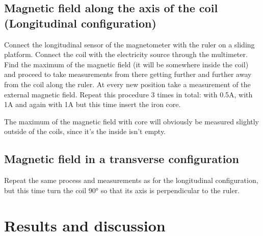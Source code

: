 \documentclass[12pt]{article}
\begin{document}
	\subsection{Magnetic field along the axis of the coil (Longitudinal configuration)}
	Connect the longitudinal sensor of the magnetometer with the ruler on a sliding platform. Connect the coil with the electricity source through the multimeter. Find the maximum of the magnetic field (it will be somewhere inside the coil) and proceed to take measurements from there getting further and further away from the coil along the ruler. At every new position take a measurement of the external magnetic field. 
	Repeat this procedure 3 times in total: with 0.5A, with 1A and again with 1A but this time insert the iron core. 
	
	The maximum of the magnetic field with core will obviously be measured slightly outside of the coils, since it's the inside isn't empty.
	
	\subsection{Magnetic field in a transverse configuration} 
	Repeat the same process and measurements as for the longitudinal configuration, but this time turn the coil 90° so that its axis is perpendicular to the ruler.
	

	\section{Results and discussion}\label{sec:erg}
\end{document}
